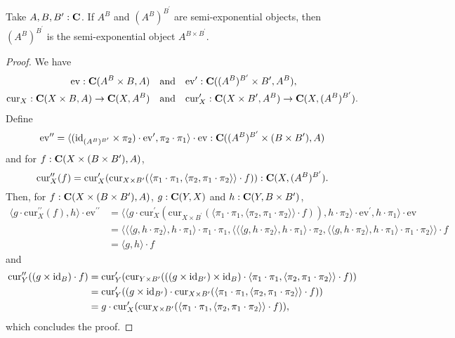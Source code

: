 \begin{lemma}
  Take $ A, B, B^\prime : \mathbf{C} $. If $ A^B $ and $ (A^B)^{B^\prime} $ are semi-exponential objects, then $ (A^B)^{B^\prime} $ is the semi-exponential object $ A^{B \times B^\prime} $.
\end{lemma}
\begin{proof}
  We have
  \begin{align*}
    \mathrm{ev} : \mathbf{C}(A^B \times B, A) \quad &\text{and} \quad \mathrm{ev}^\prime : \mathbf{C}((A^B)^{B^\prime} \times B^\prime, A^B),\\
    \mathrm{cur}_X: \mathbf{C}(X \times B, A) \to \mathbf{C}(X, A^B) \quad &\text{and} \quad \mathrm{cur}^\prime_X: \mathbf{C}(X \times B^\prime, A^B) \to \mathbf{C}(X, (A^B)^{B^\prime}).
  \end{align*}
  Define
  \[ \mathrm{ev}^{\prime \prime} = \langle (\text{id}_{(A^B)^{B^\prime}} \times \pi_2) \cdot \mathrm{ev}^\prime, \pi_2 \cdot \pi_1 \rangle \cdot \mathrm{ev} : \mathbf{C}((A^B)^{B^\prime} \times (B \times B^\prime), A) \]
  and for $ f: \mathbf{C}(X \times (B \times B^\prime), A) $,
  \[ \mathrm{cur}^{\prime \prime}_X(f) = \mathrm{cur}^\prime_X(\mathrm{cur}_{X \times B^\prime}(\langle \pi_1 \cdot \pi_1, \langle \pi_2, \pi_1 \cdot \pi_2 \rangle \rangle \cdot f)) : \mathbf{C}(X, (A^B)^{B^\prime}). \]
  Then, for $ f: \mathbf{C}(X \times (B \times B^\prime), A) $, $ g: \mathbf{C}(Y, X) $ and $ h: \mathbf{C}(Y, B \times B^\prime) $,
  \begin{align*}
    \langle g \cdot \mathrm{cur}^{\prime \prime}_X(f), h \rangle \cdot \mathrm{ev}^{\prime \prime}
    &= \langle \langle g \cdot \mathrm{cur}^\prime_X(\mathrm{cur}_{X \times B^\prime}(\langle \pi_1 \cdot \pi_1, \langle \pi_2, \pi_1 \cdot \pi_2 \rangle \rangle \cdot f)), h \cdot \pi_2 \rangle \cdot \mathrm{ev}^\prime, h \cdot \pi_1 \rangle \cdot \mathrm{ev}\\
    &= \langle \langle \langle g, h \cdot \pi_2 \rangle, h \cdot \pi_1 \rangle \cdot \pi_1 \cdot \pi_1, \langle \langle \langle g, h \cdot \pi_2 \rangle, h \cdot \pi_1 \rangle \cdot \pi_2, \langle \langle g, h \cdot \pi_2 \rangle, h \cdot \pi_1 \rangle \cdot \pi_1 \cdot \pi_2 \rangle \rangle \cdot f\\
    &= \langle g, h \rangle \cdot f
  \end{align*}
  and
  \begin{align*}
    \mathrm{cur}^{\prime \prime}_Y((g \times \text{id}_{B}) \cdot f)
    &= \mathrm{cur}^\prime_Y(\mathrm{cur}_{Y \times B^\prime}(((g \times \text{id}_{B^\prime}) \times \text{id}_{B}) \cdot \langle \pi_1 \cdot \pi_1, \langle \pi_2, \pi_1 \cdot \pi_2 \rangle \rangle \cdot f))\\
    &= \mathrm{cur}^\prime_Y((g \times \text{id}_{B^\prime}) \cdot \mathrm{cur}_{X \times B^\prime}(\langle \pi_1 \cdot \pi_1, \langle \pi_2, \pi_1 \cdot \pi_2 \rangle \rangle \cdot f))\\
    &= g \cdot \mathrm{cur}^\prime_X(\mathrm{cur}_{X \times B^\prime}(\langle \pi_1 \cdot \pi_1, \langle \pi_2, \pi_1 \cdot \pi_2 \rangle \rangle \cdot f)),\\
  \end{align*}
  which concludes the proof.
\end{proof}

